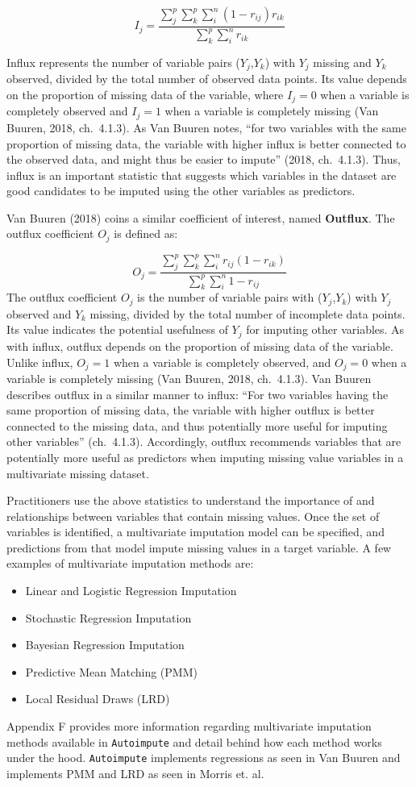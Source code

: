 \documentclass[12pt,oneside]{chicagocapstone}
\providecommand{\tightlist}{%
  \setlength{\itemsep}{0pt}\setlength{\parskip}{0pt}}
\begin{document}
\[I_j = \frac{\sum_j^p\sum_k^p\sum_i^n (1-r_{ij})r_{ik}}{\sum_k^p\sum_i^n r_{ik}}\]

Influx represents the number of variable pairs (\(Y_j\),\(Y_k\)) with
\(Y_j\) missing and \(Y_k\) observed, divided by the total number of
observed data points. Its value depends on the proportion of missing
data of the variable, where \(I_j=0\) when a variable is completely
observed and \(I_j=1\) when a variable is completely missing (Van
Buuren, 2018, ch.~4.1.3). As Van Buuren notes, ``for two variables with
the same proportion of missing data, the variable with higher influx is
better connected to the observed data, and might thus be easier to
impute'' (2018, ch.~4.1.3). Thus, influx is an important statistic that
suggests which variables in the dataset are good candidates to be
imputed using the other variables as predictors.

Van Buuren (2018) coins a similar coefficient of interest, named
\textbf{Outflux}. The outflux coefficient \(O_j\) is defined as:

\[O_j = \frac{\sum_j^p\sum_k^p\sum_i^n r_{ij}(1-r_{ik})}{\sum_k^p\sum_i^n 1-r_{ij}}\]
The outflux coefficient \(O_j\) is the number of variable pairs with
(\(Y_j\),\(Y_k\)) with \(Y_j\) observed and \(Y_k\) missing, divided by
the total number of incomplete data points. Its value indicates the
potential usefulness of \(Y_j\) for imputing other variables. As with
influx, outflux depends on the proportion of missing data of the
variable. Unlike influx, \(O_j=1\) when a variable is completely
observed, and \(O_j=0\) when a variable is completely missing (Van
Buuren, 2018, ch.~4.1.3). Van Buuren describes outflux in a similar
manner to influx: ``For two variables having the same proportion of
missing data, the variable with higher outflux is better connected to
the missing data, and thus potentially more useful for imputing other
variables'' (ch.~4.1.3). Accordingly, outflux recommends variables that
are potentially more useful as predictors when imputing missing value
variables in a multivariate missing dataset.

Practitioners use the above statistics to understand the importance of
and relationships between variables that contain missing values. Once
the set of variables is identified, a multivariate imputation model can
be specified, and predictions from that model impute missing values in a
target variable. A few examples of multivariate imputation methods are:
\begin{itemize}
\tightlist
\item
  Linear and Logistic Regression Imputation
\item
  Stochastic Regression Imputation
\item
  Bayesian Regression Imputation
\item
  Predictive Mean Matching (PMM)
\item
  Local Residual Draws (LRD)
\end{itemize}
Appendix F provides more information regarding multivariate imputation
methods available in \texttt{Autoimpute} and detail behind how each
method works under the hood. \texttt{Autoimpute} implements regressions
as seen in Van Buuren and implements PMM and LRD as seen in Morris et.
al.
\end{document}
